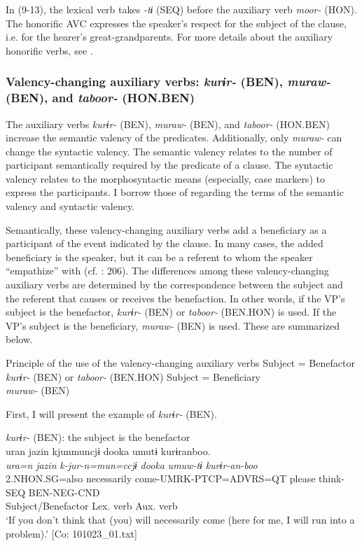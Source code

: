 In (9-13), the lexical verb takes \textit{{}-tɨ} (SEQ) before the auxiliary verb \textit{moor-} (HON). The honorific AVC expresses the speaker’s respect for the subject of the clause, i.e. for the hearer’s great-grandparents. For more details about the auxiliary honorific verbs, see .

\subsubsection{Valency-changing auxiliary verbs: \textit{kurɨr-} (BEN), \textit{muraw-} (BEN), and \textit{taboor-} (HON.BEN)}\label{sec:9.1.1.3}

The auxiliary verbs \textit{kurɨr-} (BEN), \textit{muraw-} (BEN), and \textit{taboor-} (HON.BEN) increase the semantic valency of the predicates. Additionally, only \textit{muraw-} can change the syntactic valency. The semantic valency relates to the number of participant semantically required by the predicate of a clause. The syntactic valency relates to the morphosyntactic means (especially, case markers) to express the participants. I borrow those of \citet[169-173]{Payne1997} regarding the terms of the semantic valency and syntactic valency.

Semantically, these valency-changing auxiliary verbs add a beneficiary as a participant of the event indicated by the clause. In many cases, the added beneficiary is the speaker, but it can be a referent to whom the speaker “empathize” with (cf. \citealt{Kuno1987}: 206). The differences among these valency-changing auxiliary verbs are determined by the correspondence between the subject and the referent that causes or receives the benefaction. In other words, if the VP’s subject is the benefactor, \textit{kurɨr-} (BEN) or \textit{taboor-} (BEN.HON) is used. If the VP’s subject is the beneficiary, \textit{muraw-} (BEN) is used. These are summarized below.

\ea   Principle of the use of the valency-changing auxiliary verbs \label{ex:9.14}
  \ea Subject = Benefactor\\
    \textit{kurɨr-} (BEN) or \textit{taboor-} (BEN.HON)
  \ex Subject = Beneficiary\\
    \textit{muraw-} (BEN)
    \z
\z

    
  First, I will present the example of \textit{kurɨr-} (BEN).

\ea   \textit{kurɨr-} (BEN): the subject is the benefactor\label{ex:9.15}\\
 \gllll  uran  jazin  kjunmuncjɨ  dooka  umutɨ  kurɨranboo.\\
    \textit{ura=n}  \textit{jazin}  \textit{k-jur-n=mun=ccjɨ}  \textit{dooka}  \textit{umuw-tɨ}  \textit{kurɨr-an-boo}\\
    2.NHON.SG=also  necessarily  come-UMRK-PTCP=ADVRS=QT  please  think-SEQ  BEN-NEG-CND\\
    Subject/Benefactor                                             Lex. verb  Aux. verb\\
    \glt     ‘If you don’t think that (you) will necessarily come (here for me, I will run into a problem).’ [Co: 101023\_01.txt]
\z

